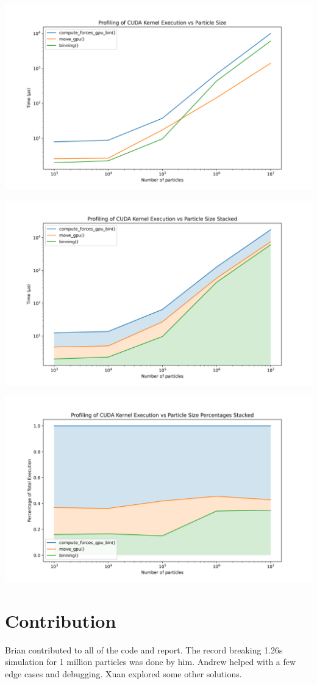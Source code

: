 \documentclass{article}
\begin{document}
\centerline{\includegraphics[width=6in]{figures/profiling.png}}

\centerline{\includegraphics[width=6in]{figures/profiling-stacked.png}}

\centerline{\includegraphics[width=6in]{figures/profiling-stacked-percentage.png}}


\section{Contribution}
Brian contributed to all of the code and report. The record breaking 1.26s simulation for 1 million particles was done by him. Andrew helped with a few edge cases and debugging. Xuan explored some other solutions.
\end{document}
